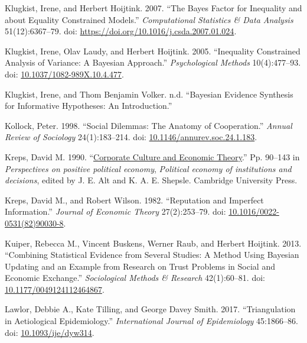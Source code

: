 \documentclass[
  11pt,
]{article}
\newlength{\cslhangindent}
\newlength{\cslentryspacingunit} %
\newenvironment{CSLReferences}[2] %
 {%
  \setlength{\parindent}{0pt}
  \ifodd #1
  \let\oldpar\par
  \def\par{\hangindent=\cslhangindent\oldpar}
  \fi
  \setlength{\parskip}{#2\cslentryspacingunit}
 }%
 {}
\begin{document}
\begin{CSLReferences}{1}{0}
\leavevmode{}%
Klugkist, Irene, and Herbert Hoijtink. 2007. {``The Bayes Factor for Inequality and about Equality Constrained Models.''} \emph{Computational Statistics \& Data Analysis} 51(12):6367--79. doi: \url{https://doi.org/10.1016/j.csda.2007.01.024}.

\leavevmode{}%
Klugkist, Irene, Olav Laudy, and Herbert Hoijtink. 2005. {``Inequality Constrained Analysis of Variance: A Bayesian Approach.''} \emph{Psychological Methods} 10(4):477--93. doi: \href{https://doi.org/10.1037/1082-989X.10.4.477}{10.1037/1082-989X.10.4.477}.

\leavevmode{}%
Klugkist, Irene, and Thom Benjamin Volker. n.d. {``{B}ayesian {E}vidence {S}ynthesis for Informative Hypotheses: An Introduction.''}

\leavevmode{}%
Kollock, Peter. 1998. {``Social Dilemmas: The Anatomy of Cooperation.''} \emph{Annual Review of Sociology} 24(1):183--214. doi: \href{https://doi.org/10.1146/annurev.soc.24.1.183}{10.1146/annurev.soc.24.1.183}.

\leavevmode{}%
Kreps, David M. 1990. {``\href{https://doi.org/10.1017/CBO9780511571657.006}{Corporate Culture and Economic Theory}.''} Pp. 90--143 in \emph{Perspectives on positive political economy}, \emph{Political economy of institutions and decisions}, edited by J. E. Alt and K. A. E. Shepsle. Cambridge University Press.

\leavevmode{}%
Kreps, David M., and Robert Wilson. 1982. {``Reputation and Imperfect Information.''} \emph{Journal of Economic Theory} 27(2):253--79. doi: \href{https://doi.org/10.1016/0022-0531(82)90030-8}{10.1016/0022-0531(82)90030-8}.

\leavevmode{}%
Kuiper, Rebecca M., Vincent Buskens, Werner Raub, and Herbert Hoijtink. 2013. {``Combining Statistical Evidence from Several Studies: A Method Using Bayesian Updating and an Example from Research on Trust Problems in Social and Economic Exchange.''} \emph{Sociological Methods \& Research} 42(1):60--81. doi: \href{https://doi.org/10.1177/0049124112464867}{10.1177/0049124112464867}.

\leavevmode{}%
Lawlor, Debbie A., Kate Tilling, and George Davey Smith. 2017. {``Triangulation in Aetiological Epidemiology.''} \emph{International Journal of Epidemiology} 45:1866--86. doi: \href{https://doi.org/10.1093/ije/dyw314}{10.1093/ije/dyw314}.


\end{CSLReferences}
\end{document}
